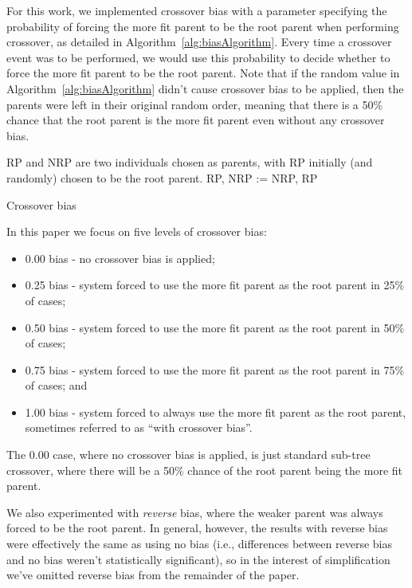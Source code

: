 \documentclass{sig-alternate}
\begin{document}
For this work, we implemented crossover bias with a parameter specifying the probability of forcing 
the more fit parent to be the root parent when performing crossover, as detailed in 
Algorithm~\ref{alg:biasAlgorithm}. Every time a 
crossover event was to be performed, we would use this probability to decide whether to force the 
more fit parent to be the root parent. Note that if the random value in Algorithm~\ref{alg:biasAlgorithm} 
didn't cause crossover bias to be applied, then the parents were left in their original random order, 
meaning that there is a 50\% chance that the root 
parent is the more fit parent even without any crossover bias.

\begin{algorithm}
\begin{algorithmic}
\Require RP and NRP are two individuals chosen as parents, with RP initially (and randomly) chosen to be the root parent.
 
        \State RP, NRP := NRP, RP  
    \EndIf
\EndIf
\end{algorithmic}
\caption{Crossover bias}
\label{alg:biasAlgorithm}
\end{algorithm}

In this paper we focus on five levels of crossover bias:
\begin{itemize}
\item 0.00 bias - no crossover bias is applied;
\item 0.25 bias - system forced to use the more fit parent as the root parent in 25\% of cases;
\item 0.50 bias - system forced to use the more fit parent as the root parent in 50\% of cases;
\item 0.75 bias - system forced to use the more fit parent as the root parent in 75\% of cases; and
\item 1.00 bias - system forced to always use the more fit parent as the root parent, sometimes referred to as ``with crossover bias''.
\end{itemize}
The 0.00 case, where no crossover bias is applied, is just standard sub-tree crossover, where there will be a 50\% chance of the root parent being the more fit parent.

We also experimented with \emph{reverse} bias, where the weaker parent was always forced to be 
the root parent. In general, however, the results with reverse bias were effectively the same as using 
no bias (i.e., differences between reverse bias and no bias weren't statistically significant), so in the 
interest of simplification we've omitted reverse bias from the remainder of the paper.
\end{document}
